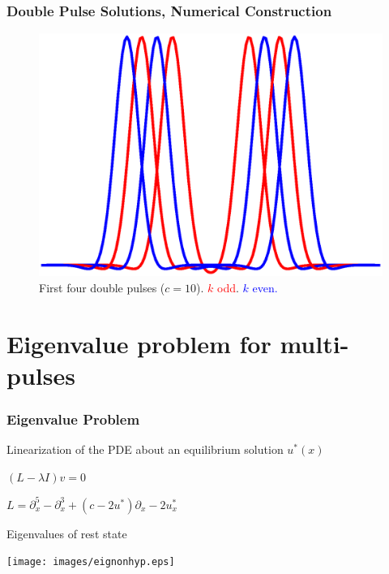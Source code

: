 \documentclass[16pt]{beamer}
\begin{document}
\begin{frame}
	\frametitle{Double Pulse Solutions, Numerical Construction}
	\fontsize{16}{7.2}\selectfont
	\begin{figure}
	\begin{center}
	\includegraphics[width=0.7\linewidth]{images/first4dp}
	\end{center}
	\caption{First four double pulses ($c = 10$). \textcolor{red}{$k$ odd}. \textcolor{blue}{$k$ even. } }
	\end{figure}
\end{frame}

\section{Eigenvalue problem for multi-pulses}

\begin{frame}
	\frametitle{Eigenvalue Problem}
	\fontsize{16}{7.2}\selectfont
	Linearization of the PDE about an equilibrium solution $u^*(x)$

	\begin{center}
		$(L - \lambda I )v = 0$
	\end{center}

	\begin{center}
		$L = \partial_x^5 - \partial_x^3 + (c - 2 u^*)\partial_x - 2 u^*_x $
	\end{center}
	Eigenvalues of rest state
	\begin{center}
		\texttt{[image: images/eignonhyp.eps]}
	\end{center}

\end{frame}
\end{document}
